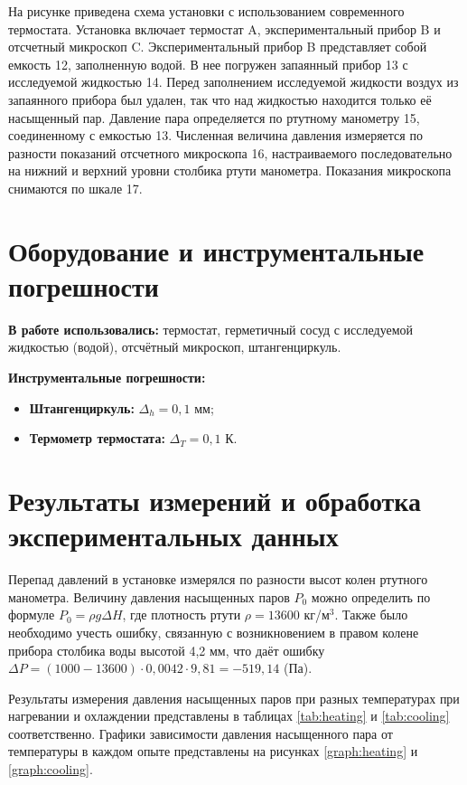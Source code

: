\documentclass[a4paper,12pt]{article} %
\begin{document}
На рисунке приведена схема установки с использованием современного термостата. Установка включает термостат A, экспериментальный прибор B и отсчетный микроскоп C. Экспериментальный прибор B представляет собой емкость 12, заполненную водой. В нее погружен запаянный прибор 13 с исследуемой жидкостью 14. Перед заполнением исследуемой жидкости воздух из запаянного прибора был удален, так что над жидкостью находится только её насыщенный пар. Давление пара определяется по ртутному манометру 15, соединенному с емкостью 13. Численная величина давления измеряется по разности показаний отсчетного микроскопа 16, настраиваемого последовательно на нижний и верхний уровни столбика ртути манометра. Показания микроскопа снимаются по шкале 17.

\section{Оборудование и инструментальные погрешности}

\textbf{В работе использовались:} термостат, герметичный сосуд с исследуемой жидкостью (водой), отсчётный микроскоп, штангенциркуль.

\textbf{Инструментальные погрешности:} 

\begin{itemize}
    \item \textbf{Штангенциркуль:} $\Delta_h = 0,1$ мм;
    \item \textbf{Термометр термостата:} $\Delta_T = 0,1$ К.
\end{itemize}

\section{Результаты измерений и обработка экспериментальных данных}

Перепад давлений в установке измерялся по разности высот колен ртутного манометра. Величину давления насыщенных паров $P_0$ можно определить по формуле $P_0 = \rho g\Delta H$, где плотность ртути $\rho = 13600$ кг/м$^3$. Также было необходимо учесть ошибку, связанную с возникновением в правом колене прибора столбика воды высотой 4,2 мм, что даёт ошибку $\Delta P = (1000 - 13600) \cdot 0,0042 \cdot 9,81 = -519,14$ (Па). 

Результаты измерения давления насыщенных паров при разных температурах при нагревании и охлаждении представлены в таблицах \ref{tab:heating} и \ref{tab:cooling} соответственно. Графики зависимости давления насыщенного пара от температуры в каждом опыте представлены на рисунках \ref{graph:heating} и \ref{graph:cooling}. 
\end{document}
